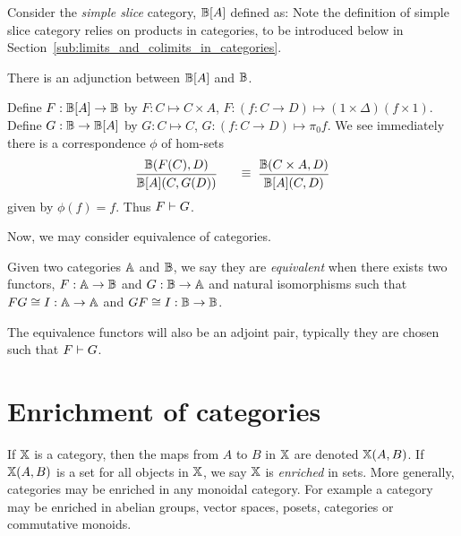 \begin{example}\label{ex:simple-slice-adjoint}
  Consider the  \emph{simple slice} category\cite{blute2009cartesian}, $\mathbb{B}[A]$  defined as:
  Note the definition of simple slice category relies on products in categories, to be introduced
  below in Section~\ref{sub:limits_and_colimits_in_categories}.

  There is an adjunction between $\mathbb{B}[A]$ and $\mathbb{B}$.

  Define $F:\mathbb{B}[A]\to \mathbb{B}$ by $F:C \mapsto C\times A$, $F:(f:C\to D) \mapsto (1\times \Delta) (f\times
  1)$.
  Define $G:\mathbb{B} \to \mathbb{B}[A]$ by $G:C\mapsto C$, $G:(f:C\to D) \mapsto \pi_0 f$. We see immediately
  there is a  correspondence $\phi$ of hom-sets
  \[
    \infer{\B[A](C,G(D))}{\B(F(C), D)}
    \qquad \raisebox{8pt}{$\equiv$}\ \ \infer{\B[A](C,D)}{\B(C\times A, D)}
  \]
  given by $\phi(f) = f$.
  Thus $F\vdash G$.
\end{example}

Now, we may consider equivalence of categories.

\begin{definition}\label{def:equivalence_of_categories}
  Given two categories $\mathbb{A}$ and $\mathbb{B}$, we say they are \emph{equivalent} when there exists two
  functors, $F:\mathbb{A} \to \mathbb{B}$ and $G:\mathbb{B} \to \mathbb{A}$ and natural isomorphisms such that $F G \cong I:\mathbb{A} \to
  \mathbb{A}$ and $G F \cong I:\mathbb{B} \to \mathbb{B}$.
\end{definition}


The equivalence functors will also be an adjoint pair, typically they are chosen such that
$F\vdash G$.

\section{Enrichment of categories} %
\label{sub:enrichement_of_categories}

If $\mathbb{X}$ is a category, then the maps from $A$ to $B$ in $\mathbb{X}$ are denoted $\mathbb{X}(A,B)$.
If $\mathbb{X}(A,B)$ is a set for all objects in $\mathbb{X}$, we say $\mathbb{X}$ is \emph{enriched} in sets. More generally,
categories may be enriched in any monoidal category. For example a category may be
enriched in abelian groups, vector spaces, posets, categories or commutative monoids.

